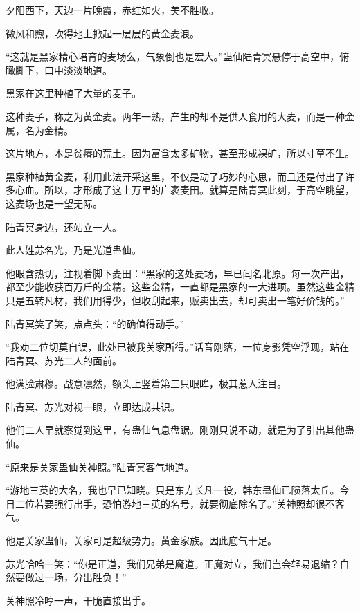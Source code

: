 
\begin{this_body}



夕阳西下，天边一片晚霞，赤红如火，美不胜收。

微风和煦，吹得地上掀起一层层的黄金麦浪。

“这就是黑家精心培育的麦场么，气象倒也是宏大。”蛊仙陆青冥悬停于高空中，俯瞰脚下，口中淡淡地道。

黑家在这里种植了大量的麦子。

这种麦子，称之为黄金麦。两年一熟，产生的却不是供人食用的大麦，而是一种金属，名为金精。

这片地方，本是贫瘠的荒土。因为富含太多矿物，甚至形成裸矿，所以寸草不生。

黑家种植黄金麦，利用此法开采这里，不仅是动了巧妙的心思，而且还是付出了许多心血。所以，才形成了这上万里的广袤麦田。就算是陆青冥此刻，于高空眺望，这麦场也是一望无际。

陆青冥身边，还站立一人。

此人姓苏名光，乃是光道蛊仙。

他眼含热切，注视着脚下麦田：“黑家的这处麦场，早已闻名北原。每一次产出，都至少能收获百万斤的金精。这些金精，一直都是黑家的一大进项。虽然这些金精只是五转凡材，我们用得少，但收刮起来，贩卖出去，却可卖出一笔好价钱的。”

陆青冥笑了笑，点点头：“的确值得动手。”

“我劝二位切莫自误，此处已被我关家所得。”话音刚落，一位身影凭空浮现，站在陆青冥、苏光二人的面前。

他满脸肃穆。战意凛然，额头上竖着第三只眼眸，极其惹人注目。

陆青冥、苏光对视一眼，立即达成共识。

他们二人早就察觉到这里，有蛊仙气息盘踞。刚刚只说不动，就是为了引出其他蛊仙。

“原来是关家蛊仙关神照。”陆青冥客气地道。

“游地三英的大名，我也早已知晓。只是东方长凡一役，韩东蛊仙已陨落太丘。今日二位若要强行出手，恐怕游地三英的名号，就要彻底除名了。”关神照却很不客气。

他是关家蛊仙，关家可是超级势力。黄金家族。因此底气十足。

苏光哈哈一笑：“你是正道，我们兄弟是魔道。正魔对立，我们岂会轻易退缩？自然要做过一场，分出胜负！”

关神照冷哼一声，干脆直接出手。


\end{this_body}
